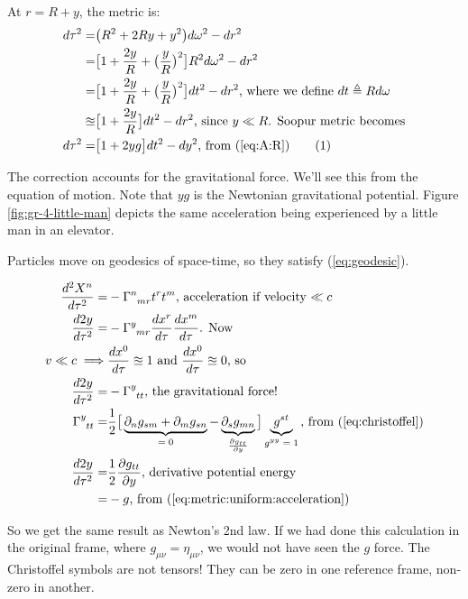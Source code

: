 \documentclass[]{article}
\newcommand\numberthis{\addtocounter{equation}{1}\tag{\theequation}}
\begin{document}
{At $r=R+y$, the metric is:
\begin{align*}
	d\tau^2 =& \big(R^2 + 2 R y + y^2\big) d \omega^2 - dr^2\\
	=& \big[1 + \frac{2  y}{R} + \big(\frac{y}{R}\big)^2\big] R^2 d \omega^2 - dr^2\\
	=& \big[1 + \frac{2  y}{R} + \big(\frac{y}{R}\big)^2\big] dt^2 - dr^2 \text{, where we define $dt\triangleq R d \omega$}\\
	\approxeq & \big[1 + \frac{2  y}{R} \big] dt^2 - dr^2 \text{, since $y \ll R$. Soopur metric becomes}\\
	d\tau^2 =& \big[1 + 2yg \big] dt^2 - dy^2 \text{, from (\ref{eq:A:R})} \numberthis \label{eq:metric:uniform:acceleration}
\end{align*}

The correction accounts for the gravitational force. We'll see this from the equation of motion. Note that $yg$ is the Newtonian gravitational potential. Figure \ref{fig:gr-4-little-man} depicts the same acceleration being experienced by a little man in an elevator.

Particles move on geodesics of space-time, so they satisfy (\ref{eq:geodesic}).

\begin{align*}
	\frac{d^2 X^n }{d\tau^2}=& - \Gamma \indices{^n_{mr}} t^r t^m \text{, acceleration if velocity $\ll c$}\\
	\frac{d2y}{d\tau^2}=& - \Gamma \indices{^y_{mr}} \frac{dx^r}{d \tau} \frac{dx^m}{d \tau} \text{. Now}\\
	v \ll c \implies & \frac{dx^0}{d \tau} \approxeq 1 \text{ and } \frac{dx^0}{d \tau} \approxeq 0 \text{, so}\\
	\frac{d2y}{d\tau^2}=& - \Gamma \indices{^y_{tt}} \text{, the gravitational force!}\\
	\Gamma\indices{^y_{tt}} =& \frac{1}{2}\big[\underbrace{\partial_n g_{sm} + \partial_m g_{sn}}_\text{$=0$}- \underbrace{\partial_s g_{mn}}_\text{$\frac{\partial g_{tt}}{\partial y}$}\big]  \underbrace{g^{st}}_\text{$g^{yy}=1$} \text{, from (\ref{eq:christoffel})}\\
	\frac{d2y}{d\tau^2}=&\frac{1}{2} \frac{\partial g_{tt}}{\partial y} \text{, derivative potential energy}\\
	=& -g \text{, from (\ref{eq:metric:uniform:acceleration})}
\end{align*}

So we get the same result as Newton's 2nd law. If we had done this calculation in the original frame, where $g_{\mu\nu}=\eta_{\mu\nu}$, we would not have seen the $g$ force. The Christoffel symbols are not tensors! They can be zero in one reference frame, non-zero in another.

}
\end{document}
